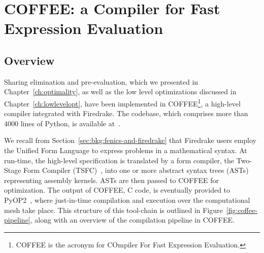 \chapter{COFFEE: a Compiler for Fast Expression Evaluation}
\label{ch:coffee}

\section{Overview}
Sharing elimination and pre-evaluation, which we presented in Chapter~\ref{ch:optimality}, as well as the low level optimizations discussed in Chapter~\ref{ch:lowlevelopt}, have been implemented in COFFEE\footnote{COFFEE is the acronym for COmpiler For Fast Expression Evaluation.}, a high-level compiler integrated with Firedrake. The codebase, which comprises more than 4000 lines of Python, is available at~\citep{coffee-code}.

We recall from Section~\ref{sec:bkg:fenics-and-firedrake} that Firedrake users employ the Unified Form Language to express problems in a mathematical syntax. At run-time, the high-level specification is translated by a form compiler, the Two-Stage Form Compiler (TSFC)~\citep{TSFC}, into one or more abstract syntax trees (ASTs) representing assembly kernels. ASTs are then passed to COFFEE for optimization. The output of COFFEE, C code, is eventually provided to PyOP2~\citep{pyop2isc}, where just-in-time compilation and execution over the computational mesh take place. This structure of this tool-chain is outlined in Figure~\ref{fig:coffee-pipeline}, along with an overview of the compilation pipeline in COFFEE. 

